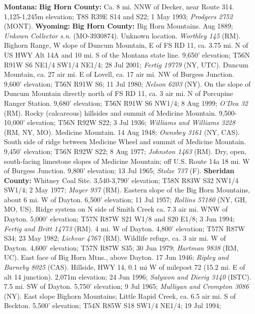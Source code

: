   \textbf{Montana:}
  \textbf{Big Horn County:}
Ca. 8 mi. NNW of Decker, near Route 314. 1,125-1,245m elevation;
T8S R39E S14 and S22; 1 May 1993; \textit{Prodgers 2752} (MONT).
  \textbf{Wyoming:}
  \textbf{Big Horn County:}
Big Horn Mountains. Aug 1889; \textit{Unkown Collector s.n.} (MO-3930874).
Unknown location. \textit{Worthley 145} (RM).
Bighorn Range, W slope of Duncum Mountain, E of FS RD 11, ca. 3.75 mi. N of
US HWY Alt 14A and 10 mi. S of the Montana state line. 9,650' elevation;
T56N R91W S6 NE1/4 SW1/4 NE1/4; 28 Jul 2001;
\textit{Fertig 19779} (NY, UTC).
Duncum Mountain, ca. 27 air mi. E of Lovell, ca. 17 air mi. NW of Burgess
Junction. 9,600' elevation; T56N R91W S6; 11 Jul 1980; \textit{Nelson 6203} (NY).
On the slope of Duncum Mountain directly north of FS RD 11, ca. 3 air mi. N of 
Porcupine Ranger Station. 9,680' elevation; T56N R91W S6 NW1/4; 8 Aug 1999; 
\textit{O'Dea 32} (RM).
Rocky (calcareous) hillsides and summit of Medicine Mountain.
9,500-10,000' elevation; T56N R92W S22; 3 Jul 1936;
\textit{Williams and Williams 3228} (RM, NY, MO).
Medicine Mountain. 14 Aug 1948; \textit{Ownsbey 3161} (NY, CAS).
South side of ridge between Medicine Wheel and summit of Medicine Mountain.
9,450' elevation; T56N R92W S22; 8 Aug 1977; \textit{Johnston 1463} (RM).
Dry, open, south-facing limestone slopes of Medicine Mountain; off U.S. Route
14a 18 mi. W of Burgess Junction. 9,800' elevation; 13 Jul 1965;
\textit{Stolze 737} (F).
  \textbf{Sheridan County:}
Whitney Coal Site. 3,540-3,790' elevation; T58N R83W S32 NW1/4 SW1/4;
2 May 1977; \textit{Mayer 937} (RM).
Eastern slope of the Big Horn Mountains, about 6 mi. W of Dayton.
6,500' elevation; 11 Jul 1957; \textit{Rollins 57180} (NY, GH, MO, US).
Ridge system on N side of Smith Creek ca. 7.3 air mi. WNW of Dayton.
5,000' elevation; T57N R87W S21 W1/8 and S20 E1/8; 3 Jun 1994;
\textit{Fertig and Britt 14773} (RM).
4 mi. W of Dayton. 4,800' elevation; T57N R87W S34; 23 May 1982;
\textit{Lichvar 4767} (RM).
Wildlife refuge, ca. 3 air mi. W of Dayton. 4,600' elevation; T57N R87W S35;
30 Jun 1979; \textit{Hartman 9838} (RM, UC).
East face of Big Horn Mtns., above Dayton. 17 Jun 1946;
\textit{Ripley and Barneby 8025} (CAS).
Hillside, HWY 14, 0.1 mi W of milepost 72 (15.2 mi. E of alt 14 junction).
2,071m elevation; 24 Jun 1996; \textit{Salywon and Dierig 3140} (ISTC).
7.5 mi. SW of Dayton. 5,750' elevation; 9 Jul 1965;
\textit{Mulligan and Crompton 3086} (NY).
East slope Bighorn Mountains; Little Rapid Creek, ca. 6.5 air mi. S of Beckton.
5,500' elevation; T54N R85W S18 SW1/4 NE1/4; 19 Jul 1994;
